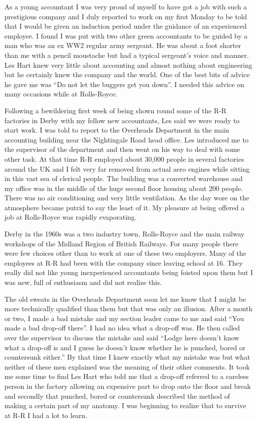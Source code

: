 \begin{multicols}{2}

As a young accountant I was very proud of myself to have got a job
with such a prestigious company and I duly reported to work on my
first Monday to be told that I would be given an induction period
under the guidance of an experienced employee. I found I was put with
two other green accountants to be guided by a man who was an ex WW2
regular army sergeant. He was about a foot shorter than me with a
pencil moustache but had a typical sergeant's voice and manner. Les
Hart knew very little about accounting and almost nothing about
engineering but he certainly knew the company and the world. One of
the best bits of advice he gave me was ``Do not let the buggers get you
down''. I needed this advice on many occasions while at Rolls-Royce.

Following a bewildering first week of being shown round some of the
R-R factories in Derby with my fellow new accountants, Les said we
were ready to start work. I was told to report to the Overheads
Department in the main accounting building near the Nightingale Road
head office. Les introduced me to the supervisor of the department and
then went on his way to deal with some other task. At that time R-R
employed about 30,000 people in several factories around the UK and I
felt very far removed from actual aero engines while sitting in this
vast sea of clerical people. The building was a converted warehouse
and my office was in the middle of the huge second floor housing about
200 people. There was no air conditioning and very little
ventilation. As the day wore on the atmosphere became putrid to say
the least of it. My pleasure at being offered a job at Rolls-Royce was
rapidly evaporating.

Derby in the 1960s was a two industry town, Rolls-Royce and the main
railway workshops of the Midland Region of British Railways. For many
people there were few choices other than to work at one of these two
employers. Many of the employees at R-R had been with the company
since leaving school at 16. They really did not like young
inexperienced accountants being foisted upon them but I was new, full
of enthusiasm and did not realize this.

The old sweats in the Overheads Department soon let me know that I
might be more technically qualified than them but that was only an
illusion. After a month or two, I made a bad mistake and my section
leader came to me and said ``You made a bad drop-off there''. I had no
idea what a drop-off was. He then called over the supervisor to
discuss the mistake and said ``Lodge here doesn't know what a drop-off
is and I guess he doesn't know whether he is punched, bored or
countersunk either.'' By that time I knew exactly what my mistake was
but what neither of these men explained was the meaning of their other
comments. It took me some time to find Les Hart who told me that a
drop-off referred to a careless person in the factory allowing an
expensive part to drop onto the floor and break and secondly that
punched, bored or countersunk described the method of making a certain
part of my anatomy. I was beginning to realize that to survive at R-R
I had a lot to learn.


\end{multicols}
